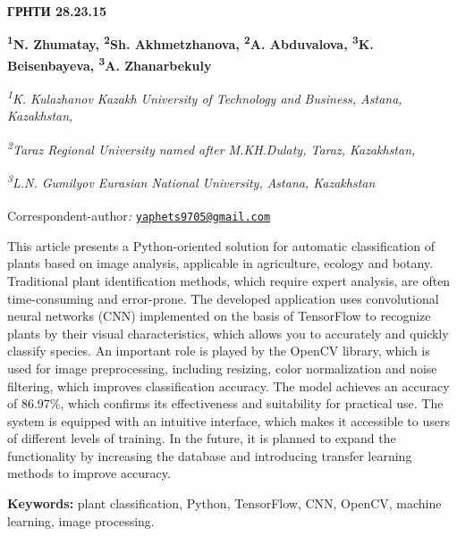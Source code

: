 {\bfseries ГРНТИ 28.23.15}

\begin{articleheader}

{\bfseries
\textsuperscript{1}N. Zhumatay\authorid,
\textsuperscript{2}Sh. Akhmetzhanova\authorid,
\textsuperscript{2}A. Abduvalova\authorid,
\textsuperscript{3}K. Beisenbayeva\authorid,
\textsuperscript{3}A. Zhanarbekuly\textsuperscript{\envelope } \authorid}
\end{articleheader}

\begin{affiliation}
\emph{\textsuperscript{1}K. Kulazhanov Kazakh University of Technology and Business, Astana, Kazakhstan,}

\emph{\textsuperscript{2}Taraz Regional University named after M.KH.Dulaty, Taraz, Kazakhstan,}

\emph{\textsuperscript{3}L.N. Gumilyov Eurasian National University, Astana, Kazakhstan}

\textsuperscript{\envelope }Correspondent-author\emph{:} \href{mailto:yaphets9705@gmail.com}{\nolinkurl{yaphets9705@gmail.com}}
\end{affiliation}

This article presents a Python-oriented solution for automatic
classification of plants based on image analysis, applicable in
agriculture, ecology and botany. Traditional plant identification
methods, which require expert analysis, are often time-consuming and
error-prone. The developed application uses convolutional neural
networks (CNN) implemented on the basis of TensorFlow to recognize
plants by their visual characteristics, which allows you to accurately
and quickly classify species. An important role is played by the OpenCV
library, which is used for image preprocessing, including resizing,
color normalization and noise filtering, which improves classification
accuracy. The model achieves an accuracy of 86.97\%, which confirms its
effectiveness and suitability for practical use. The system is equipped
with an intuitive interface, which makes it accessible to users of
different levels of training. In the future, it is planned to expand the
functionality by increasing the database and introducing transfer
learning methods to improve accuracy.

{\bfseries Keywords:} plant classification, Python, TensorFlow, CNN,
OpenCV, machine learning, image processing.

